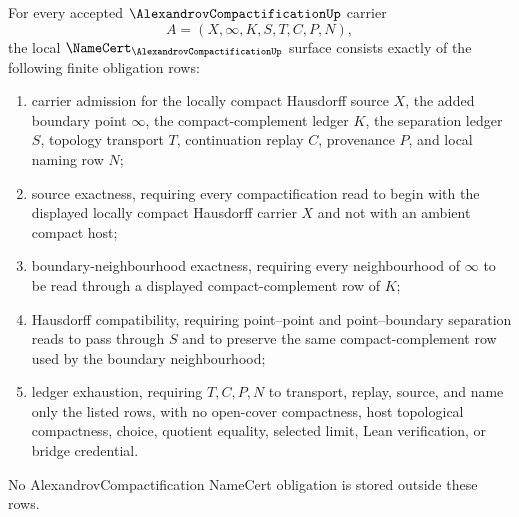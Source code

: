 \begin{theorem}
\label{thm:alexandrov-compactification-namecert-obligations}
For every accepted $\AlexandrovCompactificationUp$ carrier
$$
A=(X,\infty,K,S,T,C,P,N),
$$
the local $\NameCert_{\AlexandrovCompactificationUp}$ surface consists exactly of the following finite obligation rows:
\begin{enumerate}
\item carrier admission for the locally compact Hausdorff source $X$, the added boundary point $\infty$, the compact-complement ledger $K$, the separation ledger $S$, topology transport $T$, continuation replay $C$, provenance $P$, and local naming row $N$;
\item source exactness, requiring every compactification read to begin with the displayed locally compact Hausdorff carrier $X$ and not with an ambient compact host;
\item boundary-neighbourhood exactness, requiring every neighbourhood of $\infty$ to be read through a displayed compact-complement row of $K$;
\item Hausdorff compatibility, requiring point--point and point--boundary separation reads to pass through $S$ and to preserve the same compact-complement row used by the boundary neighbourhood;
\item ledger exhaustion, requiring $T,C,P,N$ to transport, replay, source, and name only the listed rows, with no open-cover compactness, host topological compactness, choice, quotient equality, selected limit, Lean verification, or bridge credential.
\end{enumerate}
No AlexandrovCompactification NameCert obligation is stored outside these rows.
\end{theorem}
